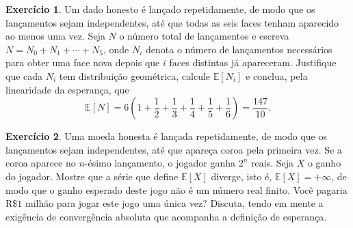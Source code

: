 \documentclass[12pt,portuguese]{article}
\theoremstyle{definition}
\newtheorem{exercise}{Exercício}
\begin{document}
\begin{exercise}\label{exercise:colecionador-dado}
Um dado honesto é lançado repetidamente, de modo que os lançamentos sejam
independentes, até que todas as seis faces tenham aparecido ao menos uma
vez. Seja \(N\) o número total de lançamentos e escreva
\(N = N_0 + N_1 + \cdots + N_5\), onde \(N_i\) denota o número de
lançamentos necessários para obter uma face nova depois que \(i\) faces
distintas já apareceram. Justifique que cada \(N_i\) tem distribuição
geométrica, calcule \(\mathbb{E}[N_i]\) e conclua, pela linearidade da
esperança, que
\[
\mathbb{E}[N]
= 6\left(1 + \frac{1}{2} + \frac{1}{3} + \frac{1}{4} + \frac{1}{5} + \frac{1}{6}\right)
= \frac{147}{10}.
\]
\end{exercise}



\begin{exercise}\label{exercise:sao-petersburgo}
Uma moeda honesta é lançada repetidamente, de modo que os lançamentos
sejam independentes, até que apareça coroa pela primeira vez. Se a coroa
aparece no \(n\)-ésimo lançamento, o jogador ganha \(2^n\) reais. Seja
\(X\) o ganho do jogador. Mostre que a série que define
\(\mathbb{E}[X]\) diverge, isto é, \(\mathbb{E}[X] = +\infty\), de modo
que o ganho esperado deste jogo não é um número real finito. Você pagaria
\(\mathrm{R}\$1\) milhão para jogar este jogo uma única vez? Discuta,
tendo em mente a exigência de convergência absoluta que acompanha a
definição de esperança.
\end{exercise}



\end{document}
